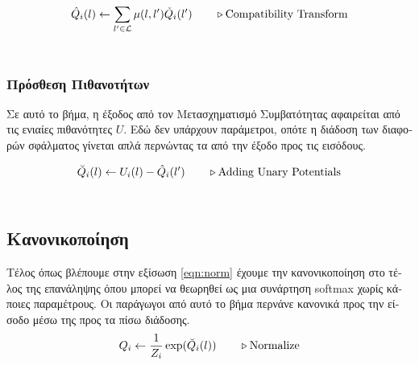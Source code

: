 \begin{equation}
    \label{compatible}
    \centering
    \hat{Q}_{i}(l) \gets \sum_{l'\in \mathcal{L}} \mu(l,l') \check{Q}_{i}(l')  \qquad \triangleright \text{Compatibility Transform} 
\end{equation}
\\[1cm]


\subsubsection{\textgreek{Πρόσθεση Πιθανοτήτων}}
\textgreek{Σε αυτό το βήμα, η έξοδος από τον Μετασχηματισμό Συμβατότητας αφαιρείται από τις ενιαίες πιθανότητες $U$. Εδώ δεν υπάρχουν παράμετροι, οπότε η διάδοση των διαφορών σφάλματος γίνεται απλά περνώντας τα από την έξοδο προς τις εισόδους.}

\begin{equation}
    \label{add}
    \centering
    \breve{Q}_{i}(l) \gets U_{i}(l) - \hat{Q}_{i}(l')  \qquad \triangleright \text{Adding Unary Potentials} 
\end{equation}
\\[1cm]

\subsection{\textgreek{Κανονικοποίηση}}
\textgreek{Τέλος όπως βλέπουμε στην εξίσωση} \ref{eqn:norm} \textgreek{έχουμε την κανονικοποίηση στο τέλος της επανάληψης όπου μπορεί να θεωρηθεί ως μια συνάρτηση} softmax \textgreek{χωρίς κάποιες παραμέτρους. Οι παράγωγοι από αυτό το βήμα περνάνε κανονικά προς την είσοδο μέσω της προς τα πίσω διάδοσης.}
\\[1cm]
\begin{equation}
    \label{eqn:norm}
    \centering
    {Q}_{i} \gets \frac{1}{Z_{i}} \exp(\breve{Q}_{i}(l)) \qquad \triangleright \text{Normalize} 
\end{equation}
\\[1cm]

